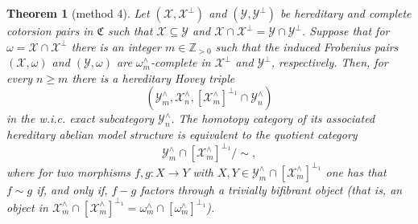\documentclass[10pt,reqno]{amsart}
\numberwithin{equation}{section}
\newtheorem{theorem}[definition]{Theorem}
\theoremstyle{remark}
\newcommand{\C}{\mathfrak{C}}
\begin{document}
\begin{theorem}[method 4]\label{thm:model_two_cotorsion_pairs}
Let $(\mathcal{X},\mathcal{X}^\perp)$ and $(\mathcal{Y},\mathcal{Y}^\perp)$ be hereditary and complete cotorsion pairs in $\C$ such that  $\mathcal{X} \subseteq \mathcal{Y}$ and $\mathcal{X} \cap \mathcal{X}^\perp = \mathcal{Y} \cap \mathcal{Y}^\perp$. Suppose that for $\omega = \mathcal{X} \cap \mathcal{X}^\perp$ there is an integer $m \in \mathbb{Z}_{>0}$ such that the induced Frobenius pairs $(\mathcal{X},\omega)$ and $(\mathcal{Y},\omega)$ are $\omega^\wedge_m$-complete in $\mathcal{X}^\perp$ and $\mathcal{Y}^\perp$, respectively. Then, for every $n \geq m$ there is a hereditary Hovey triple 
\[
(\mathcal{Y}^\wedge_m, \mathcal{X}^\wedge_n, [\mathcal{X}^\wedge_m]^{\perp_1} \cap \mathcal{Y}^\wedge_n)
\] 
in the w.i.c. exact subcategory $\mathcal{Y}^\wedge_n$. The homotopy category of its associated hereditary abelian model structure is equivalent to the quotient category 
\[
\mathcal{Y}^\wedge_m \cap [\mathcal{X}^\wedge_m]^{\perp_1} / \sim,
\] 
where for two morphisms $f, g \colon X \to Y$ with $X, Y \in \mathcal{Y}^\wedge_m \cap [\mathcal{X}^\wedge_m]^{\perp_1}$ one has that $f \sim g$ if, and only if, $f - g$ factors through a trivially bifibrant object (that is, an object in $\mathcal{X}^\wedge_m \cap [\mathcal{X}^\wedge_m]^{\perp_1} = \omega^\wedge_m \cap [\omega^\wedge_m]^{\perp_1}$). 
\end{theorem}
\end{document}
